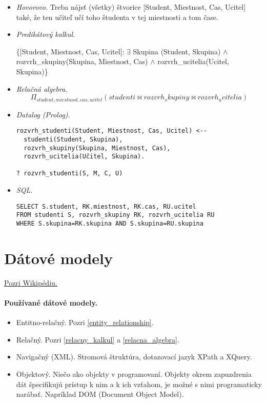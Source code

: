 \documentclass[10pt,a4paper]{article}
\begin{document}
\begin{itemize}
\item \emph{Hovorovo.} Treba nájsť (všetky) štvorice [Student, Miestnost, Cas, Ucitel]
také, že ten učiteľ učí toho študenta v tej miestnosti a tom čase. 
\item \emph{Predikátový kalkul.}

\{[Student, Miestnost, Cas, Ucitel]: $\exists$ Skupina (Student, Skupina) $\wedge$ rozvrh\_skupiny(Skupina, Miestnost, Cas) $\wedge$ rozvrh\_ucitelia(Ucitel, Skupina)\}
\item \emph{Relačná algebra.}
$$
\Pi_{student, miestnost, cas, ucitel}(studenti \Join rozvrh_skupiny \Join rozvrh_ucitelia)
$$
\item \emph{Datalog (Prolog).}
\begin{verbatim}
rozvrh_studenti(Student, Miestnost, Cas, Ucitel) <--
  studenti(Student, Skupina),
  rozvrh_skupiny(Skupina, Miestnost, Cas),
  rozvrh_ucitelia(Učitel, Skupina).

? rozvrh_studenti(S, M, C, U)
\end{verbatim} 

\item \emph{SQL.}
\begin{verbatim}
SELECT S.student, RK.miestnost, RK.cas, RU.ucitel
FROM studenti S, rozvrh_skupiny RK, rozvrh_ucitelia RU
WHERE S.skupina=RK.skupina AND S.skupina=RU.skupina
\end{verbatim}

\end{itemize}

\section{Dátové modely} 
\href{http://en.wikipedia.org/wiki/Database_model}{Pozri Wikipédiu.}

\paragraph{Používané dátové modely.}
\begin{itemize}
\item Entitno-relačný. Pozri \ref{entity_relationship}. 
\item Relačný. Pozri \ref{relacny_kalkul} a \ref{relacna_algebra}. 
\item Navigačný (XML). Stromová štruktúra, dotazovací jazyk XPath a XQuery. 
\item Objektový. Niečo ako objekty v programovaní. Objekty okrem zapuzdrenia dát špecifikujú prístup k nim a k ich vzťahom, je možné s nimi programaticky narábať. Napríklad DOM (Document Object Model). 
\end{itemize}
\end{document}
